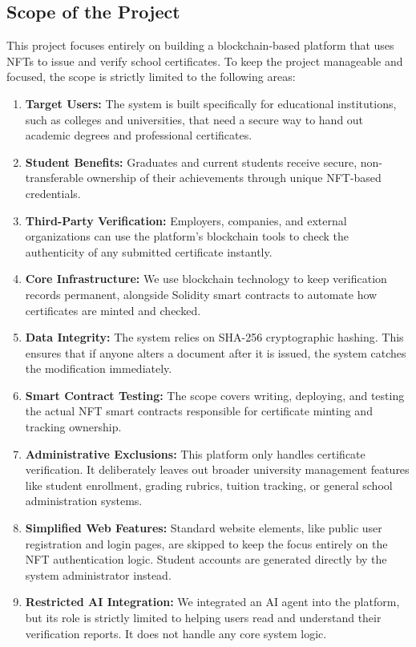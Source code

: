 \subsection{Scope of the Project}

This project focuses entirely on building a blockchain-based platform that uses NFTs to issue and verify school certificates. To keep the project manageable and focused, the scope is strictly limited to the following areas:

\begin{enumerate}

    \item \textbf{Target Users:} The system is built specifically for educational institutions, such as colleges and universities, that need a secure way to hand out academic degrees and professional certificates.

    \item \textbf{Student Benefits:} Graduates and current students receive secure, non-transferable ownership of their achievements through unique NFT-based credentials.

    \item \textbf{Third-Party Verification:} Employers, companies, and external organizations can use the platform's blockchain tools to check the authenticity of any submitted certificate instantly.

    \item \textbf{Core Infrastructure:} We use blockchain technology to keep verification records permanent, alongside Solidity smart contracts to automate how certificates are minted and checked.

    \item \textbf{Data Integrity:} The system relies on SHA-256 cryptographic hashing. This ensures that if anyone alters a document after it is issued, the system catches the modification immediately.

    \item \textbf{Smart Contract Testing:} The scope covers writing, deploying, and testing the actual NFT smart contracts responsible for certificate minting and tracking ownership.

    \item \textbf{Administrative Exclusions:} This platform only handles certificate verification. It deliberately leaves out broader university management features like student enrollment, grading rubrics, tuition tracking, or general school administration systems.

    \item \textbf{Simplified Web Features:} Standard website elements, like public user registration and login pages, are skipped to keep the focus entirely on the NFT authentication logic. Student accounts are generated directly by the system administrator instead.

    \item \textbf{Restricted AI Integration:} We integrated an AI agent into the platform, but its role is strictly limited to helping users read and understand their verification reports. It does not handle any core system logic.

\end{enumerate}